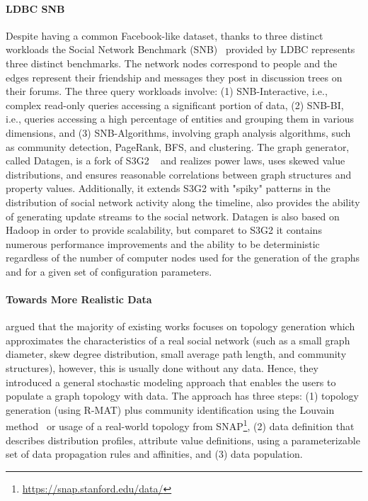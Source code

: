 \paragraph{LDBC SNB} Despite having a common Facebook-like dataset, thanks to
three distinct workloads the Social Network Benchmark
(SNB)~\cite{Erling:2015:LSN:2723372.2742786} provided by LDBC represents three
distinct benchmarks. The network nodes correspond to people and the edges
represent their friendship and messages they post in discussion trees on their
forums. The three query workloads involve: (1) SNB-Interactive, i.e., complex
read-only queries accessing a significant portion of data, (2) SNB-BI, i.e.,
queries accessing a high percentage of  entities and grouping them in various
dimensions, and (3) SNB-Algorithms, involving graph analysis algorithms, such as
community detection, PageRank, BFS, and clustering. The graph generator, called
Datagen, is a fork of S3G2 ~\cite{Pham2013} and realizes power laws, uses skewed
value distributions, and ensures reasonable correlations between graph
structures and property values. Additionally, it extends S3G2 with "spiky"
patterns in the distribution of social network activity along the timeline, also
provides the ability of generating update streams to the social network. Datagen
is also based on Hadoop in order to provide scalability, but comparet to S3G2 it
contains numerous performance improvements and the ability to be deterministic
regardless of the number of computer nodes used for the generation of the graphs
and for a given set of configuration parameters.


\paragraph{Towards More Realistic Data} \cite{Nettleton2016} argued that the majority of existing works focuses on
topology generation which approximates the characteristics of a real social
network (such as a small graph diameter, skew degree
distribution, small average path length, and community structures), however,  this is usually done without any data. Hence, they
introduced a general stochastic modeling approach that enables the users to
populate a graph topology with data. The approach has three steps: (1) topology
generation (using R-MAT) plus community identification using the Louvain
method~\cite{1742-5468-2008-10-P10008} or usage of a real-world topology from
SNAP\footnote{\url{https://snap.stanford.edu/data/}}, (2) data definition
that describes distribution profiles, attribute value definitions, using a
parameterizable set of data propagation rules and affinities, and (3) data
population.


